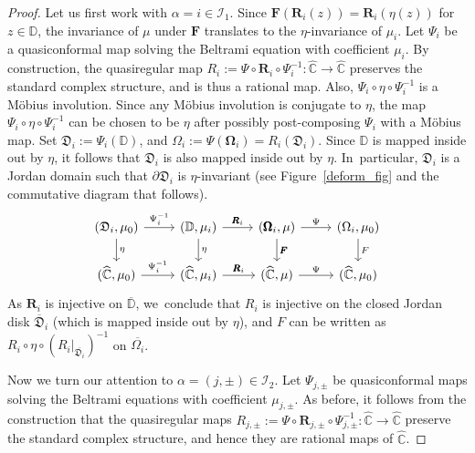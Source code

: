 \documentclass[JEP,XML,SOM,Unicode,NoFloatCountersInSection,published]{cedram}
\theoremstyle{definition}
\theoremstyle{remark}
\newcommand{\C}{\mathbb{C}}
\newcommand{\D}{\mathbb{D}}
\begin{document}
\begin{proof}
Let us first work with $\alpha=i\in\mathcal{I}_1$. Since $\pmb{F}(\pmb{R}_i(z))=\pmb{R}_i(\eta(z))$ for $z\in\D$, the invariance of $\mu$ under $\pmb{F}$ translates to the $\eta$-invariance of $\mu_i$. Let $\Psi_i$ be a quasiconformal map solving the Beltrami equation with coefficient $\mu_i$.
By construction, the quasiregular map $R_i:=\Psi\circ \pmb{R}_i\circ \Psi_i^{-1}:\widehat{\C}\to\widehat{\C}$ preserves the standard complex structure, and is thus a rational map. Also, $\Psi_i\circ\eta\circ\Psi_i^{-1}$ is a Möbius involution.
Since any Möbius involution is conjugate to $\eta$, the map $\Psi_i\circ\eta\circ\Psi_i^{-1}$ can be chosen to be $\eta$ after possibly post-composing $\Psi_i$ with a Möbius map.
Set $\mathfrak{D}_i:=\Psi_i(\D)$, and $\Omega_i:=\Psi(\pmb{\Omega}_i)= R_i(\mathfrak{D}_i)$. Since $\D$ is mapped inside out by $\eta$, it follows that $\mathfrak{D}_i$ is also mapped inside out by $\eta$. In~particular, $\mathfrak{D}_i$ is a Jordan domain such that $\partial\mathfrak{D}_i$ is $\eta$-invariant (see Figure~\ref{deform_fig} and the commutative diagram that follows).\vspace*{-3pt}
\[
\begin{tikzcd}
(\mathfrak{D}_i,\mu_0) \arrow{d}{\eta} \arrow{r}{\Psi_i^{-1}} & (\D,\mu_i) \arrow{d}{\eta} \arrow{r}{\pmb{R}_i} & (\pmb{\Omega}_i,\mu) \arrow{d}{\pmb{F}} \arrow{r}{\Psi} & (\Omega_i,\mu_0) \arrow{d}{F} \\
(\widehat{\C},\mu_0) \arrow{r}{\Psi_i^{-1}} & (\widehat{\mathbb{C}},\mu_i) \arrow{r}{\pmb{R}_i} & (\widehat{\mathbb{C}},\mu) \arrow{r}{\Psi} & (\widehat{\mathbb{C}},\mu_0)
\end{tikzcd}
\]
As $\pmb{R}_i$ is injective on $\overline{\D}$, we~conclude that $R_i$ is injective on the closed Jordan disk $\overline{\mathfrak{D}}_i$ (which is mapped inside out by $\eta$), and $F$ can be written as $R_i\circ\eta\circ (R_i\vert_{\overline{\mathfrak{D}_i}})^{-1}$ on $\overline{\Omega_i}$.

Now we turn our attention to $\alpha=(j,\pm)\in\mathcal{I}_2$. Let $\Psi_{j,\pm}$ be quasiconformal maps solving the Beltrami equations with coefficient $\mu_{j,\pm}$.
As before, it follows from the construction that the quasiregular maps $R_{j,\pm}:=\Psi\circ \pmb{R}_{j,\pm}\circ \Psi_{j,\pm}^{-1}:\widehat{\C}\to\widehat{\C}$ preserve the standard complex structure, and hence they are rational maps of $\widehat{\C}$.


\end{proof}
\end{document}
